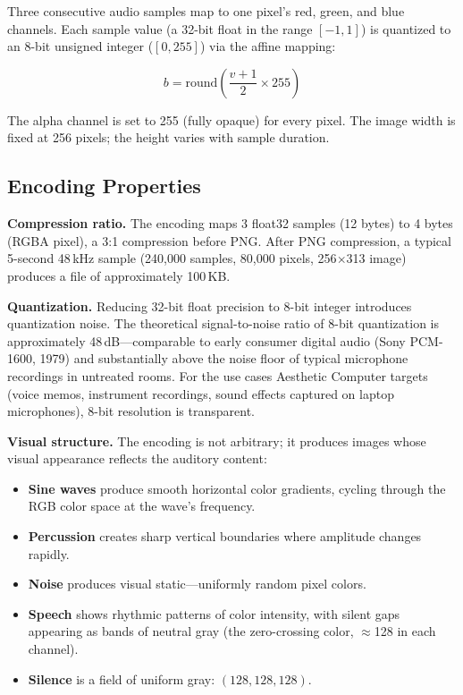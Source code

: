 \documentclass[10pt,letterpaper,twocolumn]{article}
\newcommand{\ac}{Aesthetic Computer}
\begin{document}
Three consecutive audio samples map to one pixel's red, green, and blue channels. Each sample value (a 32-bit float in the range $[-1, 1]$) is quantized to an 8-bit unsigned integer ($[0, 255]$) via the affine mapping:

\[
  b = \text{round}\left(\frac{v + 1}{2} \times 255\right)
\]

The alpha channel is set to 255 (fully opaque) for every pixel. The image width is fixed at 256 pixels; the height varies with sample duration.

\subsection{Encoding Properties}

\textbf{Compression ratio.} The encoding maps 3 float32 samples (12 bytes) to 4 bytes (RGBA pixel), a 3:1 compression before PNG. After PNG compression, a typical 5-second 48\,kHz sample (240,000 samples, 80,000 pixels, 256$\times$313 image) produces a file of approximately 100\,KB.

\textbf{Quantization.} Reducing 32-bit float precision to 8-bit integer introduces quantization noise. The theoretical signal-to-noise ratio of 8-bit quantization is approximately 48\,dB---comparable to early consumer digital audio (Sony PCM-1600, 1979) and substantially above the noise floor of typical microphone recordings in untreated rooms. For the use cases \ac{} targets (voice memos, instrument recordings, sound effects captured on laptop microphones), 8-bit resolution is transparent.

\textbf{Visual structure.} The encoding is not arbitrary; it produces images whose visual appearance reflects the auditory content:

\begin{itemize}[nosep]
  \item \textbf{Sine waves} produce smooth horizontal color gradients, cycling through the RGB color space at the wave's frequency.
  \item \textbf{Percussion} creates sharp vertical boundaries where amplitude changes rapidly.
  \item \textbf{Noise} produces visual static---uniformly random pixel colors.
  \item \textbf{Speech} shows rhythmic patterns of color intensity, with silent gaps appearing as bands of neutral gray (the zero-crossing color, $\approx$128 in each channel).
  \item \textbf{Silence} is a field of uniform gray: $(128, 128, 128)$.
\end{itemize}
\end{document}

